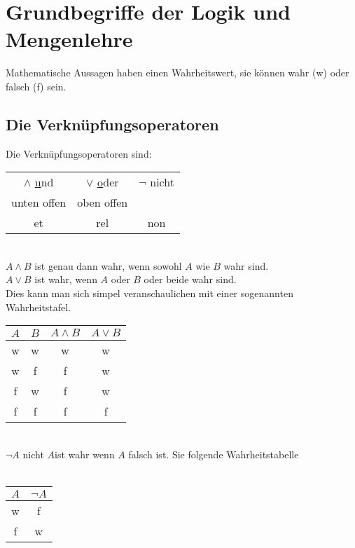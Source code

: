 \chapter{Grundbegriffe der Logik und Mengenlehre}
Mathematische Aussagen haben einen Wahrheitswert, sie können wahr (w) oder falsch (f) sein. 
\section{Die Verknüpfungsoperatoren}
Die Verknüpfungsoperatoren sind:
\qquad\\

\begin{tabular}{ccc}
\underline{$\wedge$} \underline{u}nd & \underline{$\vee$} \underline{o}der  & $\neg$  nicht \\ 
unten offen & oben offen &  \\ 
et & rel & non \\ 
\end{tabular} 

\qquad\\
$A \wedge B$ ist genau dann wahr, wenn sowohl $A$ wie $B$ wahr sind.\\
$A \vee B$ ist wahr, wenn $A$ oder $B$ oder beide wahr sind.\\
Dies kann man sich simpel veranschaulichen mit einer sogenannten Wahrheitstafel.
\qquad\\

\begin{tabular}{c|c|cc}
 $A$ & $B$ & $A \wedge B$ & $A \vee B$ \\ 
\hline \rule[-2ex]{0pt}{5.5ex} w & w & w & w \\ 
 w & f & f & w \\ 
 f & w & f & w \\ 
 f & f & f & f \\ 
\end{tabular} 
\qquad\\

$\neg A$ \glqq nicht $A$\grqq\quad ist wahr wenn $A$ falsch ist. Sie folgende Wahrheitstabelle\\
\qquad\\
\begin{tabular}{c|c}
$A$ & $\neg A$ \\ 
\hline w & f \\
f & w \\ 
\end{tabular} 
\qquad\\

